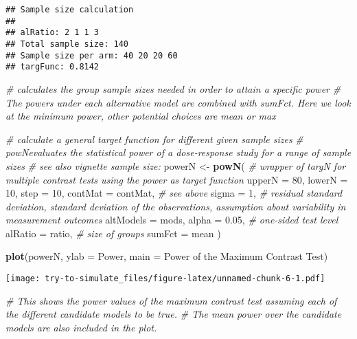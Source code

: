 \documentclass[
]{article}
\newenvironment{Shaded}{\begin{snugshade}}{\end{snugshade}}
\newcommand{\AttributeTok}[1]{\textcolor[rgb]{0.13,0.29,0.53}{#1}}
\newcommand{\CommentTok}[1]{\textcolor[rgb]{0.56,0.35,0.01}{\textit{#1}}}
\newcommand{\DecValTok}[1]{\textcolor[rgb]{0.00,0.00,0.81}{#1}}
\newcommand{\FloatTok}[1]{\textcolor[rgb]{0.00,0.00,0.81}{#1}}
\newcommand{\FunctionTok}[1]{\textcolor[rgb]{0.13,0.29,0.53}{\textbf{#1}}}
\newcommand{\NormalTok}[1]{#1}
\newcommand{\OtherTok}[1]{\textcolor[rgb]{0.56,0.35,0.01}{#1}}
\newcommand{\StringTok}[1]{\textcolor[rgb]{0.31,0.60,0.02}{#1}}
\begin{document}
\begin{verbatim}
## Sample size calculation
## 
## alRatio: 2 1 1 3 
## Total sample size: 140 
## Sample size per arm: 40 20 20 60 
## targFunc: 0.8142
\end{verbatim}

\begin{Shaded}
\begin{Highlighting}[]
\CommentTok{\# calculates the group sample sizes needed in order to attain a specific power }
\CommentTok{\# The powers under each alternative model are combined with sumFct. Here we look at the minimum power, other potential choices are mean or max}

\CommentTok{\#  calculate a general target function for different given sample sizes}
\CommentTok{\# powNevaluates the statistical power of a dose{-}response study for a range of sample sizes}
\CommentTok{\# see also vignette \textquotesingle{}sample size\textquotesingle{}:}
\NormalTok{powerN }\OtherTok{\textless{}{-}} \FunctionTok{powN}\NormalTok{( }\CommentTok{\# wrapper of targN for multiple contrast tests using the power as target function}
  \AttributeTok{upperN =} \DecValTok{80}\NormalTok{,}
  \AttributeTok{lowerN =} \DecValTok{10}\NormalTok{,}
  \AttributeTok{step =} \DecValTok{10}\NormalTok{,}
  \AttributeTok{contMat =}\NormalTok{ contMat, }\CommentTok{\# see above}
  \AttributeTok{sigma =} \DecValTok{1}\NormalTok{, }\CommentTok{\# residual standard deviation, standard deviation of the observations, assumption about variability in measurement outcomes}
  \AttributeTok{altModels =}\NormalTok{ mods,}
  \AttributeTok{alpha =} \FloatTok{0.05}\NormalTok{, }\CommentTok{\# one{-}sided test level}
  \AttributeTok{alRatio =}\NormalTok{ ratio, }\CommentTok{\# size of groups}
  \AttributeTok{sumFct =} \StringTok{\textquotesingle{}mean\textquotesingle{}}
\NormalTok{  )}

\FunctionTok{plot}\NormalTok{(powerN, }\AttributeTok{ylab =} \StringTok{\textquotesingle{}Power\textquotesingle{}}\NormalTok{, }\AttributeTok{main =} \StringTok{\textquotesingle{}Power of the Maximum Contrast Test\textquotesingle{}}\NormalTok{)}
\end{Highlighting}
\end{Shaded}

\texttt{[image: try-to-simulate\_files/figure-latex/unnamed-chunk-6-1.pdf]}

\begin{Shaded}
\begin{Highlighting}[]
\CommentTok{\# This shows the power values of the maximum contrast test assuming each of the different candidate models to be true. }
\CommentTok{\# The mean power over the candidate models are also included in the plot.}
\end{Highlighting}
\end{Shaded}
\end{document}
